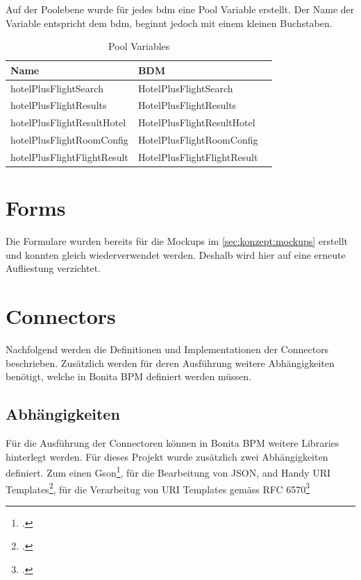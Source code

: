 Auf der Poolebene wurde für jedes \gls{bdm} eine Pool Variable erstellt. Der Name der Variable entspricht dem \gls{bdm}, beginnt jedoch mit einem kleinen Buchstaben.
\begin{table}[H] 
	\caption{Pool Variables}
	\centering
	\label{sec:umsetzung:bdm:poolvariable}
	
	\begin{tabular}{ | l | l | c | } 
		\hline
		\textbf{Name} & \textbf{BDM} \\ \hline 
		hotelPlusFlightSearch & HotelPlusFlightSearch \\ \hline
		hotelPlusFlightResults & HotelPlusFlightResults \\ \hline
		hotelPlusFlightResultHotel & HotelPlusFlightResultHotel \\ \hline
		hotelPlusFlightRoomConfig & HotelPlusFlightRoomConfig \\ \hline
	 	hotelPlusFlightFlightResult & HotelPlusFlightFlightResult \\ \hline
	\end{tabular} 
\end{table}
\section{Forms}
Die Formulare wurden bereits für die Mockups im \cref{sec:konzept:mockups}  erstellt und konnten gleich wiederverwendet werden. Deshalb wird hier auf eine erneute Aufliestung verzichtet.

\section{Connectors}
Nachfolgend werden die Definitionen und Implementationen der Connectors beschrieben. Zusätzlich werden für deren Ausführung weitere Abhängigkeiten benötigt, welche in Bonita BPM definiert werden müssen.

\subsection{Abhängigkeiten}
Für die Ausführung der Connectoren können in Bonita BPM weitere Libraries hinterlegt werden. Für dieses Projekt wurde zusätzlich zwei Abhängigkeiten definiert. Zum einen Gson\footcite{Gson_2016-06-12}, für die Bearbeitung von JSON, and Handy URI Templates\footcite{HandyUriTempaltes_2016-06-12}, für die Verarbeitug von URI Templates gemäss RFC 6570\footcite{RFC_6570_-_URI_Template_2016-06-21}

